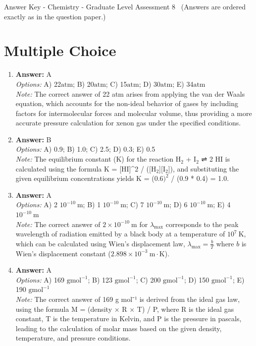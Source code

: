 \documentclass[12pt]{article}
\begin{document}
\begin{center}
Answer Key - Chemistry - Graduate Level Assessment 8 \
\small (Answers are ordered exactly as in the question paper.)
\end{center}

\section*{Multiple Choice}
\begin{enumerate}[label=\arabic*.]
\item \textbf{Answer:} A
\\ \textit{Options:} A) 22$\mathrm{atm}$; B) 20$\mathrm{atm}$; C) 15$\mathrm{atm}$; D) 30$\mathrm{atm}$; E) 34$\mathrm{atm}$
\\ \textit{Note:} The correct answer of 22 atm arises from applying the van der Waals equation, which accounts for the non-ideal behavior of gases by including factors for intermolecular forces and molecular volume, thus providing a more accurate pressure calculation for xenon gas under the specified conditions.
\item \textbf{Answer:} B
\\ \textit{Options:} A) 0.9; B) 1.0; C) 2.5; D) 0.3; E) 0.5
\\ \textit{Note:} The equilibrium constant (K) for the reaction H$_{2}$ + I$_{2}$ ⇌ 2 HI is calculated using the formula K = [HI]^2 / ([H$_{2}$][I$_{2}$]), and substituting the given equilibrium concentrations yields K = (0.$6)^2$ / (0.9 * 0.4) = 1.0.
\item \textbf{Answer:} A
\\ \textit{Options:} A) 2 $10^{-10} \mathrm{~m}$; B) 1 $10^{-10} \mathrm{~m}$; C) 7 $10^{-10} \mathrm{~m}$; D) 6 $10^{-10} \mathrm{~m}$; E) 4 $10^{-10} \mathrm{~m}$
\\ \textit{Note:} The correct answer of \(2 \times 10^{-10} \mathrm{~m}\) for \(\lambda_{\max}\) corresponds to the peak wavelength of radiation emitted by a black body at a temperature of \(10^7 \mathrm{~K}\), which can be calculated using Wien's displacement law, \(\lambda_{\max} = \frac{b}{T}\) where \(b\) is Wien's displacement constant (\(2.898 \times 10^{-3} \mathrm{~m \cdot K}\)).
\item \textbf{Answer:} A
\\ \textit{Options:} A) 169 $\mathrm{g} \mathrm{mol}^{-1}$; B) 123 $\mathrm{g} \mathrm{mol}^{-1}$; C) 200 $\mathrm{g} \mathrm{mol}^{-1}$; D) 150 $\mathrm{g} \mathrm{mol}^{-1}$; E) 190 $\mathrm{g} \mathrm{mol}^{-1}$
\\ \textit{Note:} The correct answer of 169 g mol⁻¹ is derived from the ideal gas law, using the formula M = (density × R × T) / P, where R is the ideal gas constant, T is the temperature in Kelvin, and P is the pressure in pascals, leading to the calculation of molar mass based on the given density, temperature, and pressure conditions.

\end{enumerate}
\end{document}
